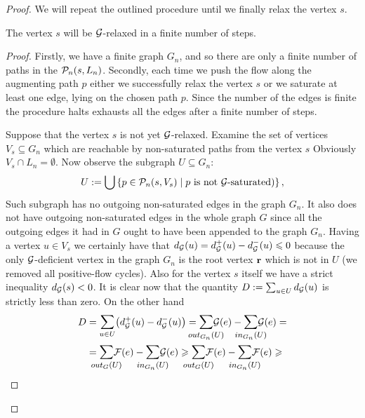 \documentclass[12pt]{article}
\begin{document}
\begin{proof}
      We will repeat the outlined procedure until we finally relax the vertex $s$.
      \begin{prop}
        The vertex $s$ will be $\cal{G}$-relaxed in a finite number of steps.
      \end{prop}
      \begin{proof}
        Firstly, we have a finite graph $G_{n}$, and so there are only a finite number of paths in the $\gnpaths(s, L_n)$.
        Secondly, each time we push the flow along the augmenting path $p$ either we successfully relax the vertex $s$
          or we saturate at least one edge, lying on the chosen path $p$.
        Since the number of the edges is finite the procedure halts exhausts all the edges after a finite number of steps.

        Suppose that the vertex $s$ is not yet $\cal{G}$-relaxed.
        Examine the set of vertices $V_s \subseteq G_n$ which are reachable by non-saturated paths from the vertex $s$
        Obviously $V_s \cap L_n = \emptyset$.
        Now observe the subgraph $U \subseteq G_n$:
        \[
          U := \bigcup \left\{p \in \gnpaths(s, V_s) \mid \text{$p$ is not $\cal{G}$-saturated})\right\},
        \]
        Such subgraph has no outgoing non-saturated edges in the graph $G_n$.
        It also does not have outgoing non-saturated edges in the whole graph $G$ since all the outgoing edges it had in $G$
          ought to have been appended to the graph $G_n$.
        Having a vertex $u \in V_s$ we certainly have that $d_{\cal{G}}(u) = d^{+}_{\cal{G}}(u) - d^{-}_{\cal{G}}(u) \leq 0$ because
          the only $\cal{G}$-deficient vertex in the graph $G_n$ is the root vertex $\root$ which is not in $U$ (we removed all positive-flow
          cycles).
        Also for the vertex $s$ itself we have a strict inequality $d_{\cal{G}}(s) < 0$.
        It is clear now that the quantity $D := \sum_{u \in U} d_{\cal{G}}(u)$ is strictly less than zero.
        On the other hand
        \[
        \begin{split}
          D &= \mathlarger\sum_{u \in U} \big(d^{+}_{\cal{G}}(u) - d^{-}_{\cal{G}}(u)\big)
          = \mathlarger{\smashoperator{\sum_{\eout_{G_n}(U)}}} \cal{G}(e) - \mathlarger{\smashoperator{\sum_{\ein_{G_n}(U)}}} \cal{G}(e) = \\
          &= \mathlarger{\smashoperator{\sum_{\eout_{G}(U)}}} \flowpos(e) - \mathlarger{\smashoperator{\sum_{\ein_{G_n}(U)}}} \cal{G}(e)
            \geq \mathlarger{\smashoperator{\sum_{\eout_G(U)}}} \flowpos(e) - \mathlarger{\smashoperator{\sum_{\ein_{G_n}(U)}}} \flowpos(e) \geq \\

\end{split}\]
\end{proof}
\end{proof}
\end{document}
